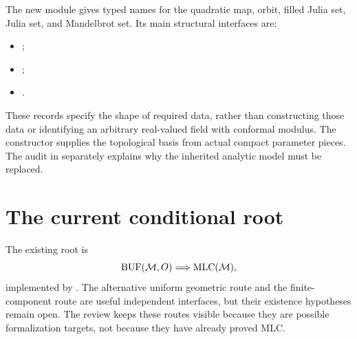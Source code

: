 The new module  gives typed names for the
quadratic map, orbit, filled Julia set, Julia set, and Mandelbrot set.  Its
main structural interfaces are:
\begin{itemize}
\item {};
\item {};
\item {}.
\end{itemize}
These records specify the shape of required data, rather than
constructing those data or identifying an arbitrary real-valued
field with conformal modulus.
The constructor
supplies the topological basis from actual compact parameter pieces.
The audit in
separately explains why the inherited analytic model must be replaced.

\section{The current conditional root}

The existing root is
\[
\mathrm{BUF}(\mathcal M,O)\Longrightarrow\mathrm{MLC}(\mathcal M),
\]
implemented by
.  The alternative uniform
geometric route and the finite-component route are useful independent
interfaces, but their existence hypotheses remain open.  The review keeps
these routes visible because they are possible formalization targets, not
because they have already proved MLC.
